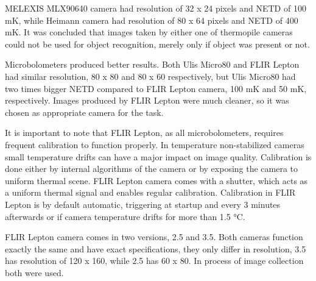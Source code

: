 MELEXIS MLX90640 camera had resolution of 32 x 24 pixels and NETD of 100 \si{\milli\kelvin}, while Heimann camera had resolution of 80 x 64 pixels and NETD of 400 \si{\milli\kelvin}.
It was concluded that images taken by either one of thermopile cameras could not be used for object recognition, merely only if object was present or not\cite{thermal_comparison}.

Microbolometers produced better results.
Both Ulis Micro80 and FLIR Lepton had similar resolution, 80 x 80 and 80 x 60 respectively, but Ulis Micro80 had two times bigger NETD compared to FLIR Lepton camera, 100 \si{\milli\kelvin} and 50 \si{\milli\kelvin}, respectively.
Images produced by FLIR Lepton were much cleaner, so it was chosen as appropriate camera for the task.

It is important to note that FLIR Lepton, as all microbolometers, requires frequent calibration to function properly.
In temperature non-stabilized cameras small temperature drifts can have a major impact on image quality\cite{thermal_book}.
Calibration is done either by internal algorithms of the camera or by exposing the camera to uniform thermal scene.
FLIR Lepton camera comes with a shutter, which acts as a uniform thermal signal and enables regular calibration.
Calibration in FLIR Lepton is by default automatic, triggering at startup and every 3 minutes afterwards or if camera temperature drifts for more than 1.5 \si{\celsius}.

FLIR Lepton camera comes in two versions, 2.5 and 3.5.
Both cameras function exactly the same and have exact specifications, they only differ in resolution, 3.5 has resolution of 120 x 160, while 2.5 has 60 x 80.
In process of image collection both were used.


